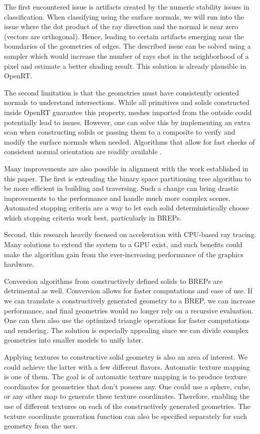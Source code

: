 \documentclass[a4paper,11pt,oneside]{article}
\begin{document}
The first encountered issue is artifacts created by the numeric stability issues in classification. When classifying using the surface normals, we will run into the issue where the dot product of the ray direction and the normal is near zero (vectors are orthogonal). Hence, leading to certain artifacts emerging near the boundaries of the geometries of edges. The described issue can be solved using a sampler which would increase the number of rays shot in the neighborhood of a pixel and estimate a better shading result. This solution is already plausible in OpenRT.

The second limitation is that the geometries must have consistently oriented normals to understand intersections. While all primitives and solids constructed inside OpenRT guarantee this property, meshes imported from the outside could potentially lead to issues. However, one can solve this by implementing an extra scan when constructing solids or passing them to a composite to verify and modify the surface normals when needed. Algorithms that allow for fast checks of consistent normal orientation are readily available \cite{normal_orientation}.

Many improvements are also possible in alignment with the work established in this paper. The first is extending the binary space partitioning tree algorithm to be more efficient in building and traversing. Such a change can bring drastic improvements to the performance and handle much more complex scenes. Automated stopping criteria are a way to let each solid deterministically choose which stopping criteria work best, particularly in BREPs.

Second, this research heavily focused on acceleration with CPU-based ray tracing. Many solutions to extend the system to a GPU exist, and such benefits could make the algorithm gain from the ever-increasing performance of the graphics hardware.

Conversion algorithms from constructively defined solids to BREPs are detrimental as well. Conversion allows for faster computations and ease of use. If we can translate a constructively generated geometry to a BREP,  we can increase performance, and final geometries would no longer rely on a recursive evaluation. One can then also use the optimized triangle operations for faster computations and rendering. The solution is especially appealing since we can divide complex geometries into smaller models to unify later.

Applying textures to constructive solid geometry is also an area of interest. We could achieve the latter with a few different flavors. Automatic texture mapping is one of them. The goal is of automatic texture mapping is to produce texture coordinates for geometries that don't possess any. One could use a sphere, cube, or any other map to generate these texture coordinates. Therefore, enabling the use of different textures on each of the constructively generated geometries.	 The texture coordinate generation function can also be specified separately for each geometry from the user.
\end{document}
